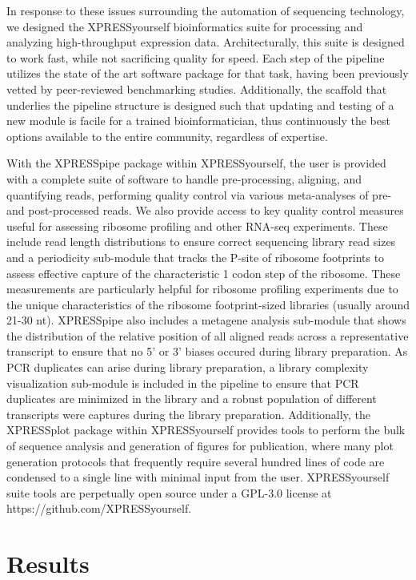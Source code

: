 \documentclass[11pt, a4paper, oneside]{article}
\begin{document}
In response to these issues surrounding the automation of sequencing technology, we designed the XPRESSyourself bioinformatics suite for processing and analyzing high-throughput expression data. Architecturally, this suite is designed to work fast, while not sacrificing quality for speed. Each step of the pipeline utilizes the state of the art software package for that task, having been previously vetted by peer-reviewed benchmarking studies. Additionally, the scaffold that underlies the pipeline structure is designed such that updating and testing of a new module is facile for a trained bioinformatician, thus continuously the best options available to the entire community, regardless of expertise. \par

With the XPRESSpipe package within XPRESSyourself, the user is provided with a complete suite of software to handle pre-processing, aligning, and quantifying reads, performing quality control via various meta-analyses of pre- and post-processed reads. We also provide access to key quality control measures useful for assessing ribosome profiling and other RNA-seq experiments. These include read length distributions to ensure correct sequencing library read sizes and a periodicity sub-module that tracks the P-site of ribosome footprints to assess effective capture of the characteristic 1 codon step of the ribosome. These measurements are particularly helpful for ribosome profiling experiments due to the unique characteristics of the ribosome footprint-sized libraries (usually around 21-30 nt). XPRESSpipe also includes a metagene analysis sub-module that shows the distribution of the relative position of all aligned reads across a representative transcript to ensure that no 5' or 3' biases occured during library preparation. As PCR duplicates can arise during library preparation, a library complexity visualization sub-module is included in the pipeline to ensure that PCR duplicates are minimized in the library and a robust population of different transcripts were captures during the library preparation. Additionally, the XPRESSplot package within XPRESSyourself provides tools to perform the bulk of sequence analysis and generation of figures for publication, where many plot generation protocols that frequently require several hundred lines of code are condensed to a single line with minimal input from the user. XPRESSyourself suite tools are perpetually open source under a GPL-3.0 license at https://github.com/XPRESSyourself.


\section{Results}
\end{document}
